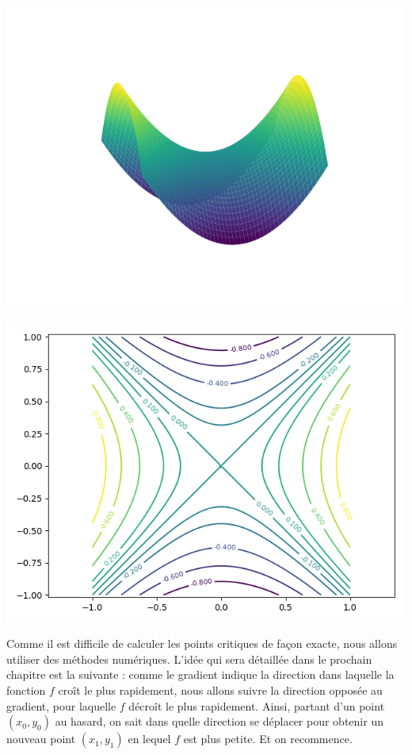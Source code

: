 \documentclass[11pt,class=report,crop=false]{standalone}
\begin{document}
\begin{exemple}
\begin{center}
\includegraphics[scale=\myscale,scale=0.5]{figures/gradient-surface-3c}
\end{center}
\begin{center}
\includegraphics[scale=\myscale,scale=0.7]{figures/gradient-surface-4}
\end{center}


\end{exemple}


Comme il est difficile de calculer les points critiques de façon exacte, nous allons utiliser des méthodes numériques.
L'idée qui sera détaillée dans le prochain chapitre est la suivante : comme le gradient indique la direction dans laquelle la fonction $f$ croît le plus rapidement, nous allons suivre la direction opposée au gradient, pour laquelle $f$ décroît le plus rapidement. Ainsi, partant d'un point $(x_0,y_0)$ au hasard, on sait dans quelle direction se déplacer pour obtenir un nouveau point $(x_1,y_1)$ en lequel $f$ est plus petite. Et on recommence.
\end{document}
